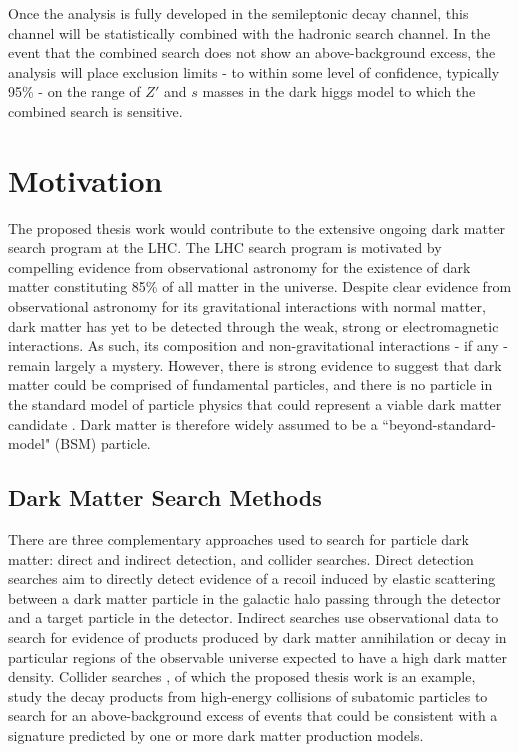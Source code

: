\documentclass[12pt]{article}
\begin{document}
Once the analysis is fully developed in the semileptonic decay channel, this channel will be statistically combined with the hadronic search channel. In the event that the combined search does not show an above-background excess, the analysis will place exclusion limits - to within some level of confidence, typically 95\% - on the range of $Z'$ and $s$ masses in the dark higgs model to which the combined search is sensitive.

\section{Motivation}

The proposed thesis work would contribute to the extensive ongoing dark matter search program at the LHC. The LHC search program is motivated by compelling evidence from observational astronomy for the existence of dark matter constituting 85\% \cite{planck} of all matter in the universe. Despite clear evidence from observational astronomy for its gravitational interactions with normal matter, dark matter has yet to be detected through the weak, strong or electromagnetic interactions. As such, its composition and non-gravitational interactions - if any - remain largely a mystery. However, there is strong evidence to suggest that dark matter could be comprised of fundamental particles, and there is no particle in the standard model of particle physics that could represent a viable dark matter candidate \cite{feng}. Dark matter is therefore widely assumed to be a ``beyond-standard-model" (BSM) particle. 

\subsection{Dark Matter Search Methods}
There are three complementary approaches used to search for particle dark matter: direct and indirect detection, and collider searches. Direct detection searches \cite{Schumann_2019, 2015gya} aim to directly detect evidence of a recoil induced by elastic scattering between a dark matter particle in the galactic halo passing through the detector and a target particle in the detector. Indirect searches \cite{CIRELLI_2012, conrad} use observational data to search for evidence of products produced by dark matter annihilation or decay in particular regions of the observable universe expected to have a high dark matter density. Collider searches \cite{DM_colliders}, of which the proposed thesis work is an example, study the decay products from high-energy collisions of subatomic particles to search for an above-background excess of events that could be consistent with a signature predicted by one or more dark matter production models.
\end{document}
